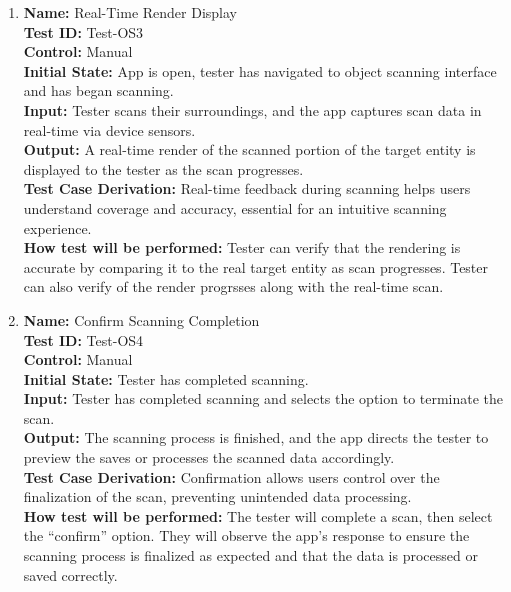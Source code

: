 \documentclass[12pt, titlepage]{article}
\begin{document}
\begin{enumerate}
  \item \textbf{Name:} Real-Time Render Display \label{itm:Test-OS3} \\
        \textbf{Test ID:} Test-OS3 \\
        \textbf{Control:} Manual \\
        \textbf{Initial State:} App is open, tester has navigated to object scanning interface and has began scanning. \\
        \textbf{Input:} Tester scans their surroundings, and the app captures scan data in real-time via device sensors. \\
        \textbf{Output:} A real-time render of the scanned portion of the target entity is displayed to the tester as the scan progresses. \\
        \textbf{Test Case Derivation:} Real-time feedback during scanning helps users understand coverage and accuracy, essential for an intuitive scanning experience. \\
        \textbf{How test will be performed:} Tester can verify that the rendering is accurate by comparing it to the real target entity as scan progresses. Tester can also verify of the render progrsses along with the real-time scan. \\

  \item \textbf{Name:} Confirm Scanning Completion \label{itm:Test-OS4} \\
        \textbf{Test ID:} Test-OS4 \\
        \textbf{Control:} Manual \\
        \textbf{Initial State:} Tester has completed scanning. \\
        \textbf{Input:} Tester has completed scanning and selects the option to terminate the scan. \\
        \textbf{Output:} The scanning process is finished, and the app directs the tester to preview the saves or processes the scanned data accordingly. \\
        \textbf{Test Case Derivation:} Confirmation allows users control over the finalization of the scan, preventing unintended data processing. \\
        \textbf{How test will be performed:} The tester will complete a scan, then select the “confirm” option. They will observe the app's response to ensure the scanning process is finalized as expected and that the data is processed or saved correctly. \\

\end{enumerate}
\end{document}
